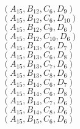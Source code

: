 \documentclass[14pt]{article}
\begin{document}
    $({A}_{15}, {B}_{12}, {C}_{6}, {D}_{9}) $ \\ 
    $({A}_{15}, {B}_{12}, {C}_{6}, {D}_{10}) $ \\ 
    $({A}_{15}, {B}_{12}, {C}_{9}, {D}_{6}) $ \\ 
    $({A}_{15}, {B}_{12}, {C}_{10}, {D}_{6}) $ \\ 
    $({A}_{15}, {B}_{13}, {C}_{6}, {D}_{7}) $ \\ 
    $({A}_{15}, {B}_{13}, {C}_{6}, {D}_{8}) $ \\ 
    $({A}_{15}, {B}_{13}, {C}_{7}, {D}_{6}) $ \\ 
    $({A}_{15}, {B}_{13}, {C}_{8}, {D}_{6}) $ \\ 
    $({A}_{15}, {B}_{14}, {C}_{6}, {D}_{7}) $ \\ 
    $({A}_{15}, {B}_{14}, {C}_{6}, {D}_{8}) $ \\ 
    $({A}_{15}, {B}_{14}, {C}_{7}, {D}_{6}) $ \\ 
    $({A}_{15}, {B}_{14}, {C}_{8}, {D}_{6}) $ \\ 
    $({A}_{15}, {B}_{15}, {C}_{6}, {D}_{6}) $ \\ 
    
\end{document}
